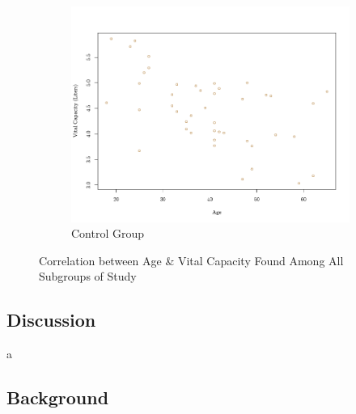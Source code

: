 \documentclass{article}
\begin{document}
\begin{figure}[h!]
			\hspace{0.05\textwidth}
			\begin{subfigure}[b]{0.3\textwidth}
				\includegraphics[width=\textwidth]{graphs/ScatterControl.png}
				\caption{Control Group}
				\label{fig:img3}
			\end{subfigure}
			\caption{Correlation between Age \& Vital Capacity Found Among All Subgroups of Study}
			\label{fig:three_images}
		\end{figure}

		\newpage

		\subsection*{Discussion}
		a

		\newpage
		\subsection*{Background}
		
\end{document}
